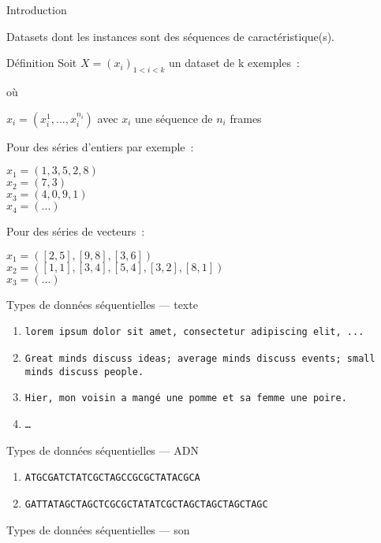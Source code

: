 \begin{frame}{Introduction}
  \begin{center}
    Datasets dont les instances sont des séquences de caractéristique(s).
  \end{center}
\end{frame}

\begin{frame}{Définition}
  Soit $X=(x_i)_{1<i<k}$ un dataset de k exemples~:

  où

  $x_i = (x_{i}^1 , ... , x_{i}^{n_i})$ avec $x_i$ une séquence de $n_i$ frames

  Pour des séries d'entiers par exemple~:

  $x_1 = (1,3,5,2,8)$ \\
  $x_2 = (7,3)$ \\
  $x_3 = (4,0,9,1)$ \\
  $x_4 = (...)$

  Pour des séries de vecteurs~:

  $x_1 = ([2,5],[9,8],[3,6])$ \\
  $x_2 = ([1,1],[3,4],[5,4],[3,2],[8,1])$ \\
  $x_3 = (...)$ 
\end{frame}

\begin{frame}{Types de données séquentielles --- texte}
  \begin{enumerate}
    \item \texttt{lorem ipsum dolor sit amet, consectetur adipiscing elit, ...}
    \item \texttt{Great minds discuss ideas; average minds discuss events; small minds discuss people.}
    \item \texttt{Hier, mon voisin a mangé une pomme et sa femme une poire.}
    \item \texttt{…}
  \end{enumerate}
\end{frame}

\begin{frame}{Types de données séquentielles --- ADN}
  \begin{enumerate}
    \item \texttt{ATGCGATCTATCGCTAGCCGCGCTATACGCA}
    \item \texttt{GATTATAGCTAGCTCGCGCTATATCGCTAGCTAGCTAGCTAGC}
  \end{enumerate}
\end{frame}

\begin{frame}{Types de données séquentielles --- son}
\end{frame}

